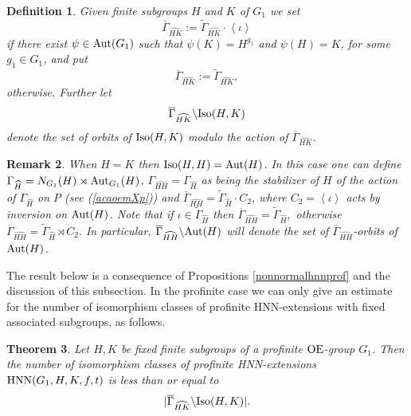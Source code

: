 \documentclass[a4paper,12pt]{article}
\newtheorem{thm}{Theorem}[section]
\newtheorem{deff}[thm]{Definition}
\def\OE{{\rm OE}}
\def\aut {{\rm Aut}}
\def\hnn {{\rm HNN}}
\def\Iso {{\rm Iso}}
\newtheorem{rem}[thm]{Remark}
\begin{document}
{%


\begin{deff}
\label{novaacaopp} Given finite subgroups $H$ and $K$ of $G_1$ we set $$\overline{\Gamma}_{\widehat{HK}}:=\widetilde{\Gamma}_{\widehat{HK}}\cdot \left\langle \iota\right\rangle$$ if there exist $\psi \in \aut(G_1)$ such that $\psi(K)=H^{g_1}$ and $\psi(H)=K$, for some $g_1\in G_1$, and put $$\overline{\Gamma}_{\widehat{HK}}:=\widetilde{\Gamma}_{\widehat{HK}},$$ otherwise. Further let $$\overline{\Gamma}_{\widehat{HK}} \backslash \Iso(H, K)$$ denote the set of orbits of $\Iso(H, K)$ modulo the action  of $\overline{\Gamma}_{\widehat{HK}}$.
\end{deff}

\begin{rem} \label{novaacao2pp} When $H=K$ then $\Iso(H,H)=\aut(H)$. In this case one can define  $\Gamma_{\widehat{H}}=N_{G_1}(H) \rtimes\aut_{G_1}(H)$, $\Gamma_{\widehat{HH}}=\Gamma_{\widehat{H}}$ as being the stabilizer of $H$ of the action of $\Gamma_{\widehat{H}}$ on  $P$ (see (\ref{acaoemXp})) and 
$\overline{\Gamma}_{\widehat{HH}}=\widetilde\Gamma_{\widehat{H}}\cdot C_2$, where $C_2= \left\langle \iota\right\rangle$ acts by inversion on $\aut(H)$. Note that if $\iota \in \widetilde\Gamma_{\widehat{H}}$ then $\overline{\Gamma}_{\widehat{HH}}=\widetilde{\Gamma}_{\widehat{H}},$ otherwise $\overline{\Gamma}_{\widehat{HH}}=\widetilde{\Gamma}_{\widehat{H}} \rtimes C_2.$ 
In particular, $ \overline{\Gamma}_{\widehat{HH}} \backslash \aut(H)$ will denote the set of $ \overline{\Gamma}_{\widehat{HH}}$-orbits of $\aut(H)$.
\end{rem}

The result below is a consequence of Propositions   \ref{nonnormalhnnprof} and the discussion of this subsection. In the profinite case we can only give an estimate for the number of isomorphism classes of profinite HNN-extensions with fixed associated subgroups, as follows.  \begin{thm}\label{profinite isomorphism number} Let $H, K$ be fixed finite subgroups of a profinite $\OE$-group $G_1$. Then the number of isomorphism classes of profinite HNN-extensions \\$\hnn(G_1, H, K, f, t)$ is less than or equal to $$|\overline{\Gamma}_{\widehat{HK}} \backslash \Iso(H, K)|.$$\end{thm}

}
\end{document}
